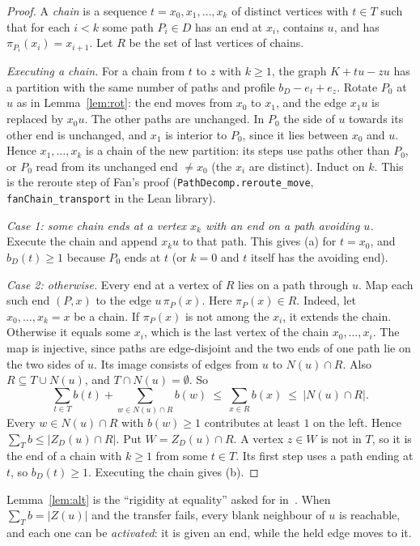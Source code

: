 \documentclass[11pt]{amsart}
\theoremstyle{definition}
\begin{document}
\begin{proof}
A \emph{chain} is a sequence $t=x_0,x_1,\dots,x_k$ of distinct vertices with $t\in T$ such that for
each $i<k$ some path $P_i\in D$ has an end at $x_i$, contains $u$, and has
$\pi_{P_i}(x_i)=x_{i+1}$. Let $R$ be the set of last vertices of chains.

\emph{Executing a chain.} For a chain from $t$ to $z$ with $k\ge1$, the graph $K+tu-zu$ has a
partition with the same number of paths and profile $b_D-e_t+e_z$. Rotate $P_0$ at $u$ as in
Lemma~\ref{lem:rot}: the end moves from $x_0$ to $x_1$, and the edge $x_1u$ is replaced by $x_0u$.
The other paths are unchanged. In $P_0$ the side of $u$ towards its other end is unchanged, and
$x_1$ is interior to $P_0$, since it lies between $x_0$ and $u$. Hence $x_1,\dots,x_k$ is a chain
of the new partition: its steps use paths other than $P_0$, or $P_0$ read from its unchanged end
$\ne x_0$ (the $x_i$ are distinct). Induct on $k$. This is the reroute step of Fan's proof
(\texttt{PathDecomp.reroute\_move}, \texttt{fanChain\_transport} in the Lean library).

\emph{Case 1: some chain ends at a vertex $x_k$ with an end on a path avoiding $u$.} Execute the
chain and append $x_ku$ to that path. This gives (a) for $t=x_0$, and $b_D(t)\ge1$ because $P_0$
ends at $t$ (or $k=0$ and $t$ itself has the avoiding end).

\emph{Case 2: otherwise.} Every end at a vertex of $R$ lies on a path through $u$. Map each such
end $(P,x)$ to the edge $u\,\pi_P(x)$. Here $\pi_P(x)\in R$. Indeed, let $x_0,\dots,x_k=x$ be a
chain. If $\pi_P(x)$ is not among the $x_i$, it extends the chain. Otherwise it equals some $x_i$,
which is the last vertex of the chain $x_0,\dots,x_i$. The map is injective, since paths are edge-disjoint and the two ends
of one path lie on the two sides of $u$. Its image consists of edges from $u$ to $N(u)\cap R$. Also
$R\subseteq T\cup N(u)$, and $T\cap N(u)=\emptyset$. So
\[
\sum_{t\in T}b(t)+\sum_{w\in N(u)\cap R}b(w)\ \le\ \sum_{x\in R}b(x)\ \le\ |N(u)\cap R|.
\]
Every $w\in N(u)\cap R$ with $b(w)\ge1$ contributes at least $1$ on the left. Hence
$\sum_Tb\le|Z_D(u)\cap R|$. Put $W=Z_D(u)\cap R$. A vertex $z\in W$ is not in $T$, so it is the end
of a chain with $k\ge1$ from some $t\in T$. Its first step uses a path ending at $t$, so
$b_D(t)\ge1$. Executing the chain gives (b).
\end{proof}

Lemma~\ref{lem:alt} is the ``rigidity at equality'' asked for in~\cite[\S8]{D6}. When
$\sum_Tb=|Z(u)|$ and the transfer fails, every blank neighbour of $u$ is reachable, and each one can
be \emph{activated}: it is given an end, while the held edge moves to it.
\end{document}
